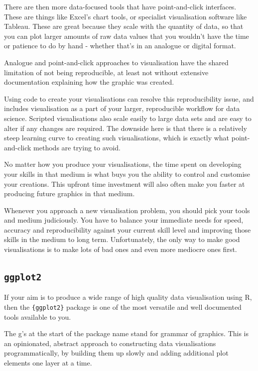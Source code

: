 \documentclass[
  letterpaper,
  DIV=11,
  numbers=noendperiod]{scrreprt}
\begin{document}
There are then more data-focused tools that have point-and-click
interfaces. These are things like Excel's chart tools, or specialist
visualisation software like Tableau. These are great because they scale
with the quantity of data, so that you can plot larger amounts of raw
data values that you wouldn't have the time or patience to do by hand -
whether that's in an analogue or digital format.

Analogue and point-and-click approaches to visualisation have the shared
limitation of not being reproducible, at least not without extensive
documentation explaining how the graphic was created.

Using code to create your visualisations can resolve this
reproducibility issue, and includes visualisation as a part of your
larger, reproducible workflow for data science. Scripted visualisations
also scale easily to large data sets and are easy to alter if any
changes are required. The downside here is that there is a relatively
steep learning curve to creating such visualisations, which is exactly
what point-and-click methods are trying to avoid.

No matter how you produce your visualisations, the time spent on
developing your skills in that medium is what buys you the ability to
control and customise your creations. This upfront time investment will
also often make you faster at producing future graphics in that medium.

Whenever you approach a new visualisation problem, you should pick your
tools and medium judiciously. You have to balance your immediate needs
for speed, accuracy and reproducibility against your current skill level
and improving those skills in the medium to long term. Unfortunately,
the only way to make good visualisations is to make lots of bad ones and
even more mediocre ones first.

\subsection{\texorpdfstring{\texttt{ggplot2}}{ggplot2}}\label{ggplot2}

If your aim is to produce a wide range of high quality data
visualisation using R, then the \texttt{\{ggplot2\}} package is one of
the most versatile and well documented tools available to you.

The g's at the start of the package name stand for grammar of graphics.
This is an opinionated, abstract approach to constructing data
visualisations programmatically, by building them up slowly and adding
additional plot elements one layer at a time.
\end{document}

